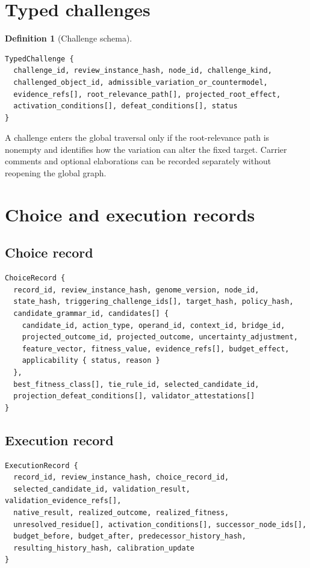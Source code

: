 \documentclass[10pt]{article}
\newtheorem{definition}{Definition}[section]
\begin{document}
\section{Typed challenges}

\begin{definition}[Challenge schema]
\begin{Verbatim}[fontsize=\small,frame=single]
TypedChallenge {
  challenge_id, review_instance_hash, node_id, challenge_kind,
  challenged_object_id, admissible_variation_or_countermodel,
  evidence_refs[], root_relevance_path[], projected_root_effect,
  activation_conditions[], defeat_conditions[], status
}
\end{Verbatim}
\end{definition}

A challenge enters the global traversal only if the root-relevance path is nonempty and identifies how the variation can alter the fixed target.  Carrier comments and optional elaborations can be recorded separately without reopening the global graph.

\section{Choice and execution records}

\subsection{Choice record}
\begin{Verbatim}[fontsize=\small,frame=single]
ChoiceRecord {
  record_id, review_instance_hash, genome_version, node_id,
  state_hash, triggering_challenge_ids[], target_hash, policy_hash,
  candidate_grammar_id, candidates[] {
    candidate_id, action_type, operand_id, context_id, bridge_id,
    projected_outcome_id, projected_outcome, uncertainty_adjustment,
    feature_vector, fitness_value, evidence_refs[], budget_effect,
    applicability { status, reason }
  },
  best_fitness_class[], tie_rule_id, selected_candidate_id,
  projection_defeat_conditions[], validator_attestations[]
}
\end{Verbatim}

\subsection{Execution record}
\begin{Verbatim}[fontsize=\small,frame=single]
ExecutionRecord {
  record_id, review_instance_hash, choice_record_id,
  selected_candidate_id, validation_result, validation_evidence_refs[],
  native_result, realized_outcome, realized_fitness,
  unresolved_residue[], activation_conditions[], successor_node_ids[],
  budget_before, budget_after, predecessor_history_hash,
  resulting_history_hash, calibration_update
}
\end{Verbatim}
\end{document}
